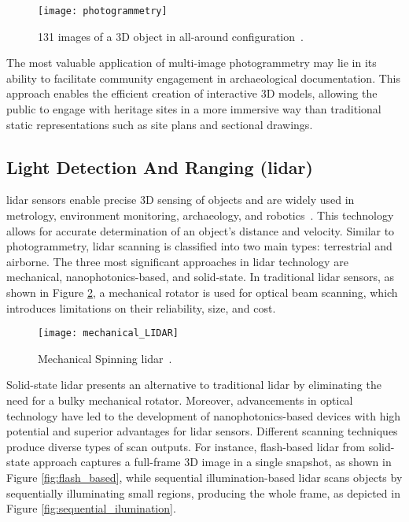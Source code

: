 \begin{figure}[h!]
    \centering
    \texttt{[image: photogrammetry]}
    \caption{131 images of a \gls{3D} object in all-around configuration~\cite{luhmann2016sensor}.}
    \label{fig:photo2}
\end{figure} 
\FloatBarrier

  
The most valuable application of multi-image photogrammetry
may lie in its ability to facilitate community engagement in archaeological documentation.
This approach enables the efficient creation of interactive \gls{3D} models, allowing the public to engage with heritage sites
in a more immersive way than traditional static representations such as site plans and sectional drawings. 

\subsection{Light Detection And Ranging (\gls{lidar})}
\label{sec:lidar}

\gls{lidar} sensors enable precise \gls{3D} sensing of objects and are widely used in metrology, environment monitoring, archaeology, and robotics~\cite{li2022progress}.
This technology allows for accurate determination of an object’s distance and velocity. 
Similar to photogrammetry, \gls{lidar} scanning is classified into two main types: terrestrial and airborne.
The three most significant approaches in \gls{lidar} technology are mechanical, nanophotonics-based, and solid-state.
In traditional \gls{lidar} sensors, as shown in Figure \ref{fig:mechanical_LIDAR}, a mechanical rotator is used for optical beam scanning, which introduces limitations on their reliability, size, and cost.

 
\begin{figure}[h!]
    \centering
    \texttt{[image: mechanical\_LIDAR]}
    \caption{Mechanical Spinning \gls{lidar}~\cite{inbook}.}
    \label{fig:mechanical_LIDAR}
\end{figure} 
\FloatBarrier


Solid-state \gls{lidar} presents an alternative to traditional \gls{lidar} by eliminating the need for a bulky mechanical rotator. %
Moreover, advancements in optical technology have led to the development of nanophotonics-based devices with high potential and superior advantages for \gls{lidar} sensors. %
Different scanning techniques produce diverse types of scan outputs. For instance, flash-based \gls{lidar} from solid-state approach captures a full-frame \gls{3D} image in a single snapshot, as shown in Figure \ref{fig:flash_based}, while sequential illumination-based \gls{lidar} scans objects by sequentially illuminating small regions, producing the whole frame, as depicted in Figure \ref{fig:sequential_ilumination}. \\

